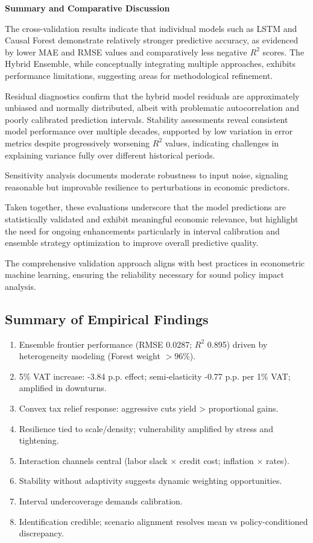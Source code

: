 \vspace{0.5cm}

\noindent \textbf{Summary and Comparative Discussion}

The cross-validation results indicate that individual models such as LSTM and Causal Forest demonstrate relatively stronger predictive accuracy, as evidenced by lower MAE and RMSE values and comparatively less negative \( R^2 \) scores. The Hybrid Ensemble, while conceptually integrating multiple approaches, exhibits performance limitations, suggesting areas for methodological refinement.

Residual diagnostics confirm that the hybrid model residuals are approximately unbiased and normally distributed, albeit with problematic autocorrelation and poorly calibrated prediction intervals. Stability assessments reveal consistent model performance over multiple decades, supported by low variation in error metrics despite progressively worsening \( R^2 \) values, indicating challenges in explaining variance fully over different historical periods.

Sensitivity analysis documents moderate robustness to input noise, signaling reasonable but improvable resilience to perturbations in economic predictors.

Taken together, these evaluations underscore that the model predictions are statistically validated and exhibit meaningful economic relevance, but highlight the need for ongoing enhancements particularly in interval calibration and ensemble strategy optimization to improve overall predictive quality.

The comprehensive validation approach aligns with best practices in econometric machine learning, ensuring the reliability necessary for sound policy impact analysis.





\subsection{Summary of Empirical Findings}
\begin{enumerate}
  \item Ensemble frontier performance (RMSE 0.0287; $R^2$ 0.895) driven by heterogeneity modeling (Forest weight $>$96\%).
  \item 5\% VAT increase: -3.84 p.p. effect; semi-elasticity -0.77 p.p. per 1\% VAT; amplified in downturns.
  \item Convex tax relief response: aggressive cuts yield > proportional gains.
  \item Resilience tied to scale/density; vulnerability amplified by stress and tightening.
  \item Interaction channels central (labor slack $\times$ credit cost; inflation $\times$ rates).
  \item Stability without adaptivity suggests dynamic weighting opportunities.
  \item Interval undercoverage demands calibration.
  \item Identification credible; scenario alignment resolves mean vs policy-conditioned discrepancy.
\end{enumerate}
